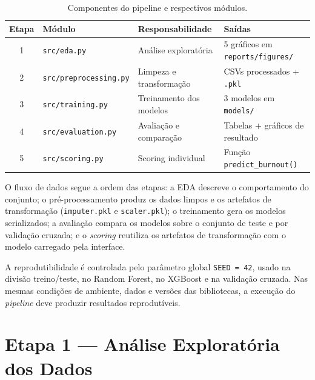 \documentclass[conference]{IEEEtran}
\newcommand{\fonte}[1][elaborado pelos autores.]{%
\par\vspace{1pt}{\footnotesize\centering Fonte: #1\par}}
\begin{document}
\begin{table}[!t]
\centering
\caption{Componentes do pipeline e respectivos módulos.}
\label{tab:pipeline}
\begin{tabular}{clll}
\toprule
\textbf{Etapa} & \textbf{Módulo}                         & \textbf{Responsabilidade} & \textbf{Saídas} \\
\midrule
1              & \texttt{src/eda.py}
& Análise exploratória
& 5 gráficos em \texttt{reports/figures/}                                               \\
2              & \texttt{src/preprocessing.py}
& Limpeza e transformação
& CSVs processados + \texttt{.pkl}                                                      \\
3              & \texttt{src/training.py}
& Treinamento dos modelos
& 3 modelos em \texttt{models/}                                                         \\
4              & \texttt{src/evaluation.py}
& Avaliação e comparação
& Tabelas + gráficos de resultado                                                       \\
5              & \texttt{src/scoring.py}
& Scoring individual
& Função \texttt{predict_burnout()}                                                    \\
\bottomrule
\end{tabular}
\fonte
\end{table}

O fluxo de dados segue a ordem das etapas: a EDA descreve o comportamento
do conjunto; o pré-processamento produz os dados limpos e os artefatos de
transformação (\texttt{imputer.pkl} e \texttt{scaler.pkl}); o treinamento
gera os modelos serializados; a avaliação compara os modelos sobre o
conjunto de teste e por validação cruzada; e o \textit{scoring} reutiliza
os artefatos de transformação com o modelo carregado pela interface.

A reprodutibilidade é controlada pelo parâmetro global \texttt{SEED = 42},
usado na divisão treino/teste, no Random Forest, no XGBoost e na validação
cruzada. Nas mesmas condições de ambiente, dados e versões das bibliotecas,
a execução do \textit{pipeline} deve produzir resultados reprodutíveis.

\section{Etapa 1 — Análise Exploratória dos Dados}
\label{sec:eda}
\end{document}
